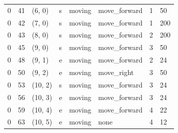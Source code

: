 \begin{table}[H]
\begin{tabular}{llllllll}
0 & 41 & (6, 0) & s & moving & move\_forward & 1 & 50 \\
0 & 42 & (7, 0) & s & moving & move\_forward & 1 & 200 \\
0 & 43 & (8, 0) & s & moving & move\_forward & 2 & 200 \\
0 & 45 & (9, 0) & s & moving & move\_forward & 3 & 50 \\
0 & 48 & (9, 1) & e & moving & move\_forward & 2 & 24 \\
0 & 50 & (9, 2) & e & moving & move\_right & 3 & 50 \\
0 & 53 & (10, 2) & s & moving & move\_forward & 3 & 24 \\
0 & 56 & (10, 3) & e & moving & move\_forward & 3 & 24 \\
0 & 59 & (10, 4) & e & moving & move\_forward & 4 & 22 \\
0 & 63 & (10, 5) & e & moving & none & 4 & 12 \\
    \bottomrule
  \end{tabular}
\end{table}